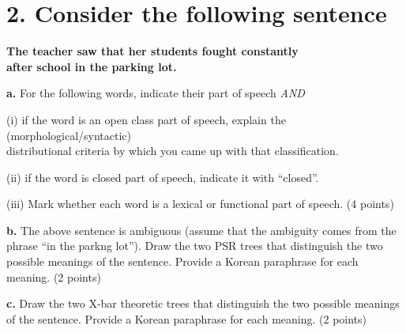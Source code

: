 \documentclass{article}
\begin{document}
\section{2. Consider the following sentence \normalsize}
\begin{center}
     \textbf{The teacher saw that her students fought constantly \\ after school in the parking lot.} \par
\end{center}
\bigskip
\noindent \textbf{a.} For the following words, indicate their part of speech \textit{AND} \par
\medskip \noindent (i) if the word is an open class part of speech, explain the (morphological/syntactic)\\ distributional criteria by which you came up with that classification.\par
\vspace{1em}
\noindent (ii) if the word is closed part of speech, indicate it with ``closed''.\par
\vspace{1em}
\noindent (iii) Mark whether each word is a lexical or functional part of speech. (4 points) \par
\vspace{2em}
\begin{description}
    \setlength{\itemsep}{2em}
    \item[\textbf{The}] 
    \item[\textbf{Teacher}] 
    \item[\textbf{Saw}]
    \item[\textbf{That}]
    \item[\textbf{Her}]
    \item[\textbf{Constantly}]
    \item[\textbf{After}]
    \item[\textbf{Parking}]
\end{description}

\newpage
\noindent \textbf{b.} The above sentence is ambiguous (assume that the ambiguity comes from the phrase ``in the parkng lot''). Draw the two PSR trees that distinguish the two possible meanings of the sentence. Provide a Korean paraphrase for each meaning. (2 points) \par
\vspace{10cm}
\null\vfill

\newpage
\noindent \textbf{c.} Draw the two X-bar theoretic trees that distinguish the two possible meanings of the sentence. Provide a Korean paraphrase for each meaning. (2 points)
\vspace{10cm}
\null\vfill
\end{document}
